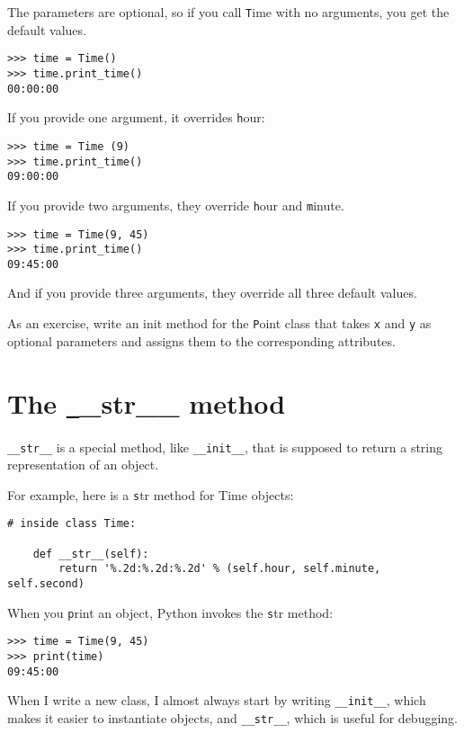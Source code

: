 \documentclass[
DIV=11,
fontsize=13,
twoside,
headinclude=false,
titlepage=firstiscover,
abstract=true,
headsepline=true,
footsepline=true,
chapterprefix=true, %
headings=big,
bibliography=totoc,%
captions=tableheading
]{scrbook}
\theoremstyle{definition}
\begin{document}
The parameters are optional, so if you call {\texttt Time} with
no arguments, you get the default values.

\begin{lstlisting}
>>> time = Time()
>>> time.print_time()
00:00:00
\end{lstlisting}
%
If you provide one argument, it overrides {\texttt hour}:

\begin{lstlisting}
>>> time = Time (9)
>>> time.print_time()
09:00:00
\end{lstlisting}
%
If you provide two arguments, they override {\texttt hour} and
{\texttt minute}.

\begin{lstlisting}
>>> time = Time(9, 45)
>>> time.print_time()
09:45:00
\end{lstlisting}
%
And if you provide three arguments, they override all three
default values.

As an exercise, write an init method for the {\texttt Point} class that takes
{\texttt x} and {\texttt y} as optional parameters and assigns
them to the corresponding attributes.


\section{The {\texttt \_\_str\_\_} method}

\verb"__str__" is a special method, like \verb"__init__",
that is supposed to return a string representation of an object.

For example, here is a {\texttt str} method for Time objects:

\begin{lstlisting}
# inside class Time:

    def __str__(self):
        return '%.2d:%.2d:%.2d' % (self.hour, self.minute, self.second)
\end{lstlisting}
%
When you {\texttt print} an object, Python invokes the {\texttt str} method:

\begin{lstlisting}
>>> time = Time(9, 45)
>>> print(time)
09:45:00
\end{lstlisting}
%
When I write a new class, I almost always start by writing 
\verb"__init__", which makes it easier to instantiate objects, and 
\verb"__str__", which is useful for debugging.
\end{document}
